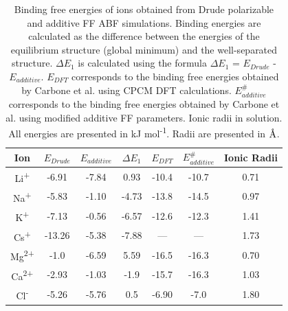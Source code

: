 \begin{table}
    \centering
    \caption[Binding free energies of ions obtained from Drude polarizable and additive FF ABF simulations. Binding energies from literature are also presented]{Binding free energies of ions obtained from Drude polarizable and additive FF ABF simulations. Binding energies are calculated as the difference between the energies of the equilibrium structure (global minimum) and the well-separated structure. $\Delta E_{1}$ is calculated using the formula $\Delta E_{1}$ = $E_{Drude}$ - $E_{additive}$. $E_{DFT}$ corresponds to the binding free energies obtained by Carbone et al. using CPCM DFT calculations.\supercite{williams_effective_2017} $E_{additive}^{\#}$ corresponds to the binding free energies obtained by Carbone et al. using modified additive FF parameters.\supercite{williams_effective_2017}  Ionic radii in solution.\supercite{marcus_ionic_1988} All energies are presented in kJ mol\textsuperscript{-1}. Radii are presented in $\text{\normalfont\AA}$.}
    \begin{tabular}{ccccccc}
        \toprule
        Ion                     &   $E_{Drude}$ &   $E_{additive}$  &   $\Delta E_{1}$  &   $E_{DFT}$\supercite{williams_effective_2017}    &   $E_{additive}^{\#}$\supercite{williams_effective_2017}   &   Ionic Radii\supercite{marcus_ionic_1988} \\ \midrule
        Li\textsuperscript{+}   & -6.91  & -7.84 & 0.93  & -10.4 & -10.7 & 0.71 \\
        Na\textsuperscript{+}   & -5.83  & -1.10 & -4.73 & -13.8 & -14.5 & 0.97 \\
        K\textsuperscript{+}    & -7.13  & -0.56 & -6.57 & -12.6 & -12.3 & 1.41 \\
        Cs\textsuperscript{+}   & -13.26 & -5.38 & -7.88 & —     & —     & 1.73 \\
        Mg\textsuperscript{2+}  & -1.0   & -6.59 & 5.59  & -16.5 & -16.3 & 0.70 \\
        Ca\textsuperscript{2+}  & -2.93  & -1.03 & -1.9  & -15.7 & -16.3 & 1.03 \\
        Cl\textsuperscript{-}   & -5.26  & -5.76 & 0.5   & -6.90 & -7.0  & 1.80 \\ \bottomrule
    \end{tabular}
\end{table}

